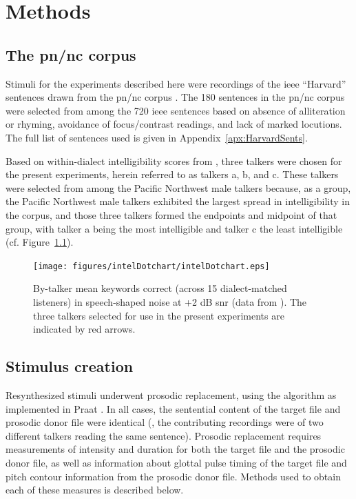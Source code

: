 \chapter{Methods\label{chap:Methods}}

\section{The \ac{pn/nc} corpus}
Stimuli for the experiments described here were recordings of the \ac{ieee} “Harvard” sentences \citep{HarvardSents} drawn from the \ac{pn/nc} corpus \citep{xxx}.  The 180 sentences in the \ac{pn/nc} corpus were selected from among the 720 \ac{ieee} sentences based on absence of alliteration or rhyming, avoidance of focus/contrast readings, and lack of marked locutions.  The full list of sentences used is given in Appendix~\ref{apx:HarvardSents}.  

Based on within-dialect intelligibility scores from \citet{McCloyEtAl2013}, three talkers were chosen for the present experiments, herein referred to as talkers \ac{a}, \ac{b}, and \ac{c}.  These talkers were selected from among the Pacific Northwest male talkers because, as a group, the Pacific Northwest male talkers exhibited the largest spread in intelligibility in the corpus, and those three talkers formed the endpoints and midpoint of that group, with talker \ac{a} being the most intelligible and talker \ac{c} the least intelligible (cf. Figure~\ref{fig:dotchart}).

\begin{figure}
	\begin{centering}
	\texttt{[image: figures/intelDotchart/intelDotchart.eps]}
	\caption[Intelligibility of talkers used to make the stimuli]{By-talker mean keywords correct (across 15 dialect-matched listeners) in speech-shaped noise at +2 dB \ac{snr} (data from \citealt{McCloyEtAl2013}).  The three talkers selected for use in the present experiments are indicated by red arrows.\label{fig:dotchart}}
	\end{centering}
\end{figure}

\section{Stimulus creation\label{sec:StimDesign}}
Resynthesized stimuli underwent prosodic replacement, using the \psola{} algorithm as implemented in Praat \citep{praat}.  In all cases, the sentential content of the target file and prosodic donor file were identical (\ie, the contributing recordings were of two different talkers reading the same sentence).  Prosodic replacement requires measurements of intensity and duration for both the target file and the prosodic donor file, as well as information about glottal pulse timing of the target file and pitch contour information from the prosodic donor file.  Methods used to obtain each of these measures is described below.

